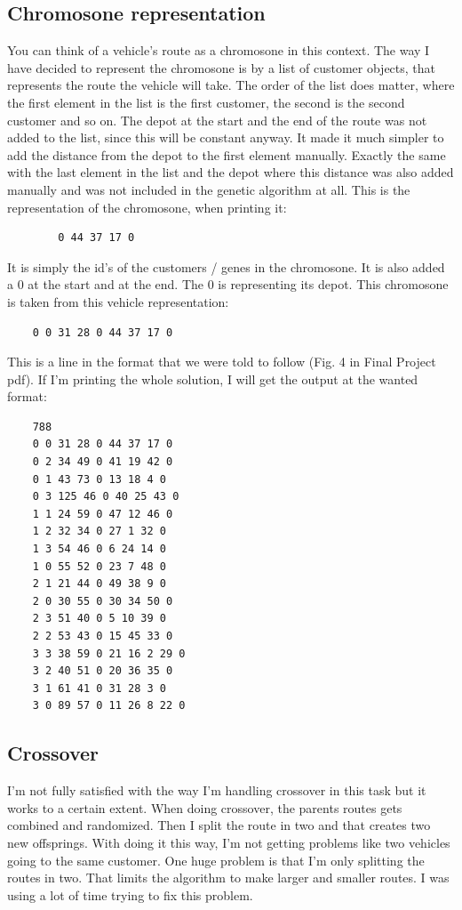 \documentclass[titlepage, 11pt]{article}
\begin{document}
    \subsection{Chromosone representation}
    You can think of a vehicle's route as a chromosone in this context. The way I have decided to represent the chromosone is by a list of customer objects, that represents the route the vehicle will take. The order of the list does matter, where the first element in the list is the first customer, the second is the second customer and so on. The depot at the start and the end of the route was not added to the list, since this will be constant anyway. It made it much simpler to add the distance from the depot to the first element manually. Exactly the same with the last element in the list and the depot where this distance was also added manually and was not included in the genetic algorithm at all. This is the representation of the chromosone, when printing it: 
    \begin{lstlisting}
        0 44 37 17 0
    \end{lstlisting}
It is simply the id's of the customers / genes in the chromosone. It is also added a 0 at the start and at the end. The 0 is representing its depot. This chromosone is taken from this vehicle representation: 
\begin{lstlisting}
    0 0 31 28 0 44 37 17 0
\end{lstlisting}
This is a line in the format that we were told to follow (Fig. 4 in Final Project pdf). If I'm printing the whole solution, I will get the output at the wanted format:
\begin{lstlisting}
    788
    0 0 31 28 0 44 37 17 0
    0 2 34 49 0 41 19 42 0
    0 1 43 73 0 13 18 4 0
    0 3 125 46 0 40 25 43 0
    1 1 24 59 0 47 12 46 0
    1 2 32 34 0 27 1 32 0
    1 3 54 46 0 6 24 14 0
    1 0 55 52 0 23 7 48 0
    2 1 21 44 0 49 38 9 0
    2 0 30 55 0 30 34 50 0
    2 3 51 40 0 5 10 39 0
    2 2 53 43 0 15 45 33 0
    3 3 38 59 0 21 16 2 29 0
    3 2 40 51 0 20 36 35 0
    3 1 61 41 0 31 28 3 0
    3 0 89 57 0 11 26 8 22 0
\end{lstlisting}

\subsection{Crossover}
I'm not fully satisfied with the way I'm handling crossover in this task but it works to a certain extent. When doing crossover, the parents routes gets combined and randomized. Then I split the route in two and that creates two new offsprings. With doing it this way, I'm not getting problems like two vehicles going to the same customer. One huge problem is that I'm only splitting the routes in two. That limits the algorithm to make larger and smaller routes. I was using a lot of time trying to fix this problem. 
\end{document}
